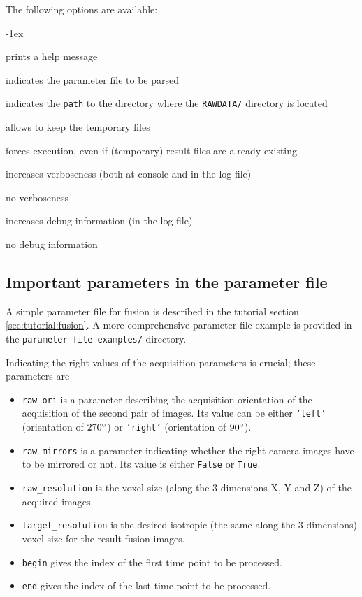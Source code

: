 The following options are available:
\begin{description}
  \itemsep -1ex
\item[\texttt{-h}] prints a help message
\item[\texttt{-p \underline{file}}] indicates the parameter file to be parsed
\item[\texttt{-e \underline{path}}] indicates the
  \texttt{\underline{path}} to the directory where the
  \texttt{RAWDATA/} directory is located
\item[\texttt{-k}] allows to keep the temporary files
\item[\texttt{-f}] forces execution, even if (temporary) result files
  are already existing
\item[\texttt{-v}] increases verboseness (both at console and in the
  log file)
\item[\texttt{-nv}] no verboseness
\item[\texttt{-d}]  increases debug information (in the
  log file)
\item[\texttt{-nd}] no debug information
\end{description}


\subsection{Important parameters in the parameter file}
\label{sec:cli:fuse:important:parameters}

A simple parameter file for fusion is described in the tutorial
section \ref{sec:tutorial:fusion}. A more comprehensive parameter file
example is provided in the \texttt{parameter-file-examples/} directory.

Indicating the right values of the
acquisition parameters is crucial; these parameters are
\begin{itemize}
\itemsep -1ex
\item \texttt{raw\_ori} is a parameter describing the acquisition
  orientation of the acquisition of the second pair of images. Its value can be either \texttt{'left'} (orientation of
  $270 \degree$) or \texttt{'right'} (orientation of
  $90 \degree$).
\item \texttt{raw\_mirrors} is a parameter indicating whether the
  right camera images have to be mirrored or not. Its value is either
  \texttt{False} or \texttt{True}.
\item \texttt{raw\_resolution} is the voxel size (along the 3
    dimensions X, Y and Z) of the acquired images.
\item \texttt{target\_resolution} is the desired isotropic (the
    same along the 3 dimensions) voxel size for the result fusion
    images.
\item \texttt{begin} gives the index of the first time point to be
  processed.
\item \texttt{end} gives the index of the last time point to be processed.
\end{itemize}


